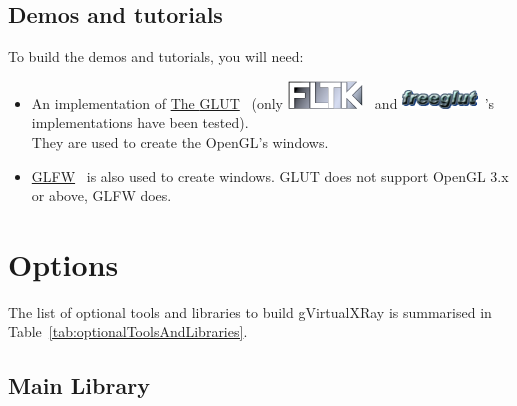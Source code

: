 \documentclass[11pt,oneside,a4paper,final]{article}
\begin{document}
\subsection{Demos and tutorials}

To build the demos and tutorials, you will need:
\begin{itemize}
 \item An implementation of \href{http://www.opengl.org/resources/libraries/glut/}{The \Gls{GLUT}}~\cite{glut} (only \href{http://www.fltk.org/}{\includegraphics[width=2cm]{Fltk_shadow}}~\cite{fltk} and \href{http://freeglut.sourceforge.net/}{\includegraphics[width=2cm]{Freeglut_logo}}~\cite{freeglut}'s implementations have been tested). \\
 They are used to create the OpenGL's windows.
 \item \href{http://www.glfw.org/}{GLFW}~\cite{glfw} is also used to create windows. \Gls{GLUT} does not support OpenGL 3.x or above, GLFW does. \\
\end{itemize}



\section{Options}

The list of optional tools and libraries to build gVirtualXRay is summarised in Table~\ref{tab:optionalToolsAndLibraries}.

\subsection{Main Library}
\end{document}
